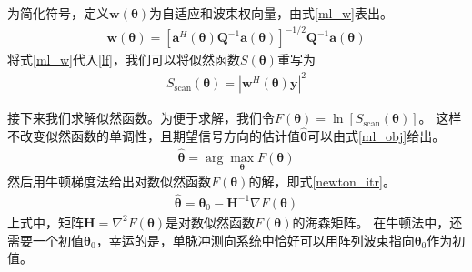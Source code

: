 \documentclass[master]{thesis-uestc}
\begin{document}
为简化符号，定义$\bm{w}(\bm{\theta})$为自适应和波束权向量，由式\eqref{ml_w}表出。
\begin{equation}\label{ml_w}
    \begin{aligned}
        \bm{w}(\bm{\theta})=
        \left[\bm{a}^{H}(\bm{\theta}) \bm{Q}^{-1} \bm{a}(\bm{\theta})\right]^{-1 / 2} 
        \bm{Q}^{-1} \bm{a}(\bm{\theta})
    \end{aligned}
\end{equation}
将式\eqref{ml_w}代入\eqref{lf}，我们可以将似然函数$S(\bm{\theta})$重写为
\begin{equation}
    \begin{aligned}
        S_{\mathrm{scan}}(\bm{\theta})=\left|\bm{w}^{H}(\bm{\theta}) \bm{y}\right|^{2}
    \end{aligned}
\end{equation}

接下来我们求解似然函数。为便于求解，我们令$F(\bm{\theta})=\ln \left[S_{\mathrm{scan}}(\bm{\theta})\right]$。
这样不改变似然函数的单调性，且期望信号方向的估计值$\hat{\bm{\theta}}$可以由式\eqref{ml_obj}给出。
\begin{equation}\label{ml_obj}
    \begin{aligned}
        \hat{\bm{\theta}}=\arg\max_{\bm{\theta}} F(\bm{\theta})
    \end{aligned}
\end{equation}
然后用牛顿梯度法给出对数似然函数$F(\bm{\theta})$的解，即式\eqref{newton_itr}。
\begin{equation}\label{newton_itr}
    \begin{aligned}
        \hat{\bm{\theta}}=\bm{\theta}_0-\bm{H}^{-1} \nabla F(\bm{\theta})
    \end{aligned}
\end{equation}
上式中，矩阵$\bm{H}=\nabla^2F(\bm{\theta})$是对数似然函数$F(\bm{\theta})$的海森矩阵。
在牛顿法中，还需要一个初值$\bm{\theta}_0$，幸运的是，单脉冲测向系统中恰好可以用阵列波束指向$\bm{\theta}_0$作为初值。
\end{document}
